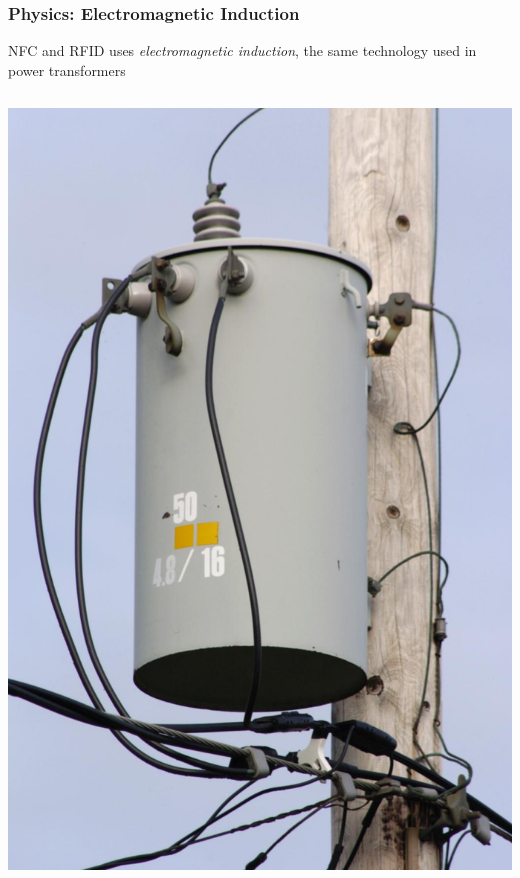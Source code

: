 \documentclass[unknownkeysallowed]{beamer}
\begin{document}
\begin{frame}
\frametitle{Physics: Electromagnetic Induction}
  \begin{center}\begin{minipage}{.9\textwidth}
  NFC and RFID uses \textit{electromagnetic induction}, the same technology used in power transformers \newline
  \begin{columns}[T]
  \begin{column}{.5\textwidth}
    \begin{block}{}\begin{center}
      \includegraphics[width=0.2\paperwidth]{figures/Polemount-singlephase-closeup.jpg}
    \end{center}\end{block}

\end{column}
\end{columns}
\end{minipage}
\end{center}
\end{frame}
\end{document}
